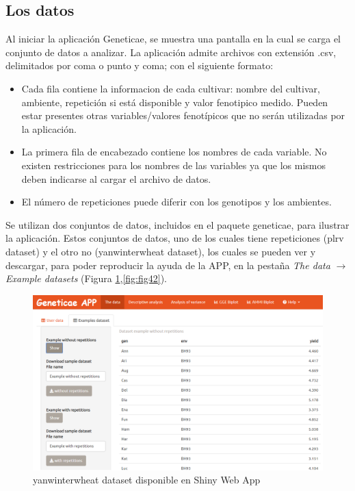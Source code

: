 \subsection{Los datos}
Al iniciar la aplicación Geneticae, se muestra una pantalla en la cual se carga el conjunto de datos a analizar. La aplicación admite archivos con extensión .csv, delimitados por coma o punto y coma; con el siguiente formato: 
\begin{itemize}
\item Cada fila contiene la informacion de cada cultivar: nombre del cultivar, ambiente, repetición si está disponible y valor fenotipico medido. Pueden estar presentes otras variables/valores fenotípicos que no serán utilizadas por la aplicación.
\item La primera fila de encabezado contiene los nombres de cada variable. No existen restricciones para los nombres de las variables ya que los mismos deben indicarse al cargar el archivo de datos.
\item El número de repeticiones puede diferir con los genotipos y los ambientes.
\end{itemize}
Se utilizan dos conjuntos de datos, incluidos en el paquete geneticae, para ilustrar la aplicación. Estos conjuntos de datos, uno de los cuales tiene repeticiones (plrv dataset) y el otro no (yanwinterwheat dataset), los cuales se pueden ver y descargar, para poder reproducir la ayuda de la APP, en la pestaña \emph{The data} $\rightarrow$ \emph{Example datasets} (Figura \ref{fig:fig41},\ref{fig:fig42}). 
\begin{figure}[H]
	\begin{center}
		\includegraphics[width=16cm]{./Graficos/Exampledatasets_withoutrep.png}
	\end{center}
	\caption{yanwinterwheat dataset disponible en Shiny Web App}
	\label{fig:fig41}
\end{figure}

